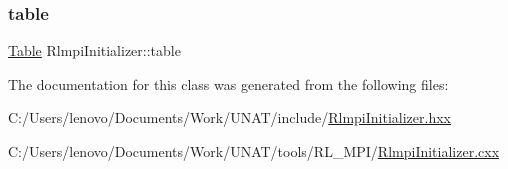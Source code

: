 \mbox{\label{classRlmpiInitializer_a23796d30caf16cdf78e08ebe5a708588}} 
\subsubsection{\texorpdfstring{table}{table}}
{\footnotesize\ttfamily \mbox{\hyperlink{structTable}{Table}} Rlmpi\+Initializer\+::table}



The documentation for this class was generated from the following files\+:\begin{DoxyCompactItemize}
\item 
C\+:/\+Users/lenovo/\+Documents/\+Work/\+U\+N\+A\+T/include/\mbox{\hyperlink{include_2RlmpiInitializer_8hxx}{Rlmpi\+Initializer.\+hxx}}\item 
C\+:/\+Users/lenovo/\+Documents/\+Work/\+U\+N\+A\+T/tools/\+R\+L\+\_\+\+M\+P\+I/\mbox{\hyperlink{RlmpiInitializer_8cxx}{Rlmpi\+Initializer.\+cxx}}\end{DoxyCompactItemize}
